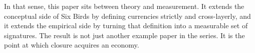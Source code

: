 In that sense, this paper sits between theory and measurement. It extends the conceptual side of Six Birds by defining currencies strictly and cross-layerly, and it extends the empirical side by turning that definition into a measurable set of signatures. The result is not just another example paper in the series. It is the point at which closure acquires an economy.
